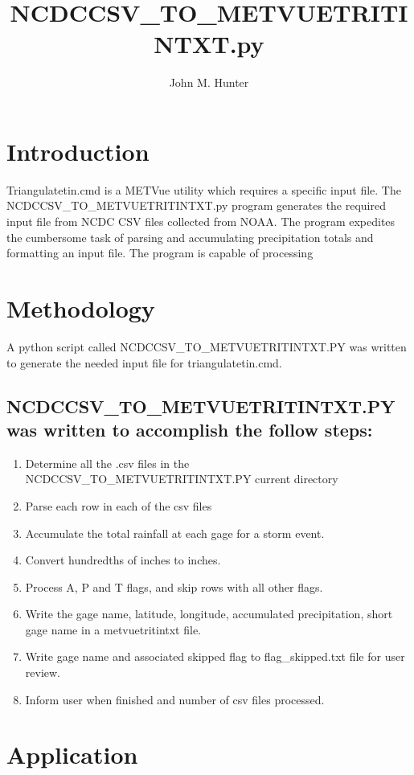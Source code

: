 \documentclass[11pt]{article} %
\title{NCDCCSV\_TO\_METVUETRITINTXT.py}
\author{John M. Hunter}
\begin{document}
\maketitle


\section{Introduction}

Triangulatetin.cmd is a METVue utility which requires a specific input file.  The NCDCCSV\_TO\_METVUETRITINTXT.py program generates the required input file from NCDC CSV files collected from NOAA.  The program expedites the cumbersome task of parsing and accumulating precipitation totals and formatting an input file.  The program is capable of processing

\section{Methodology}
A python script called NCDCCSV\_TO\_METVUETRITINTXT.PY was written to generate the needed input file for triangulatetin.cmd.
\subsection{NCDCCSV\_TO\_METVUETRITINTXT.PY was written to accomplish the follow steps:}
\begin{enumerate}
\item Determine all the .csv files in the NCDCCSV\_TO\_METVUETRITINTXT.PY current directory 
\item Parse each row in each of the csv files
\item Accumulate the total rainfall at each gage for a storm event.
\item Convert hundredths of inches to inches. 
\item Process A, P and T flags, and skip rows with all other flags.
\item Write the gage name, latitude, longitude, accumulated precipitation, short gage name in a metvuetritintxt file.
\item Write gage name and associated skipped flag to flag\_skipped.txt file for user review.
\item Inform user when finished and number of csv files processed.
\end{enumerate}
\section{Application}
\end{document}
